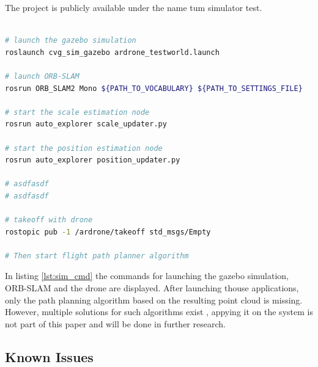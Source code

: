 	The project is publicly available under the name tum simulator test.
	
	\begin{lstlisting}[language=bash, caption= Launching the simulated environment, label=lst:sim_cmd]
	
# launch the gazebo simulation
roslaunch cvg_sim_gazebo ardrone_testworld.launch
	
# launch ORB-SLAM
rosrun ORB_SLAM2 Mono ${PATH_TO_VOCABULARY} ${PATH_TO_SETTINGS_FILE}

# start the scale estimation node
rosrun auto_explorer scale_updater.py

# start the position estimation node
rosrun auto_explorer position_updater.py

# asdfasdf
# asdfasdf
	
# takeoff with drone 
rostopic pub -1 /ardrone/takeoff std_msgs/Empty

# Then start flight path planner algorithm

	\end{lstlisting}
	
	In listing \ref{lst:sim_cmd} the commands for launching the gazebo simulation, ORB-SLAM and the drone are displayed. After launching thouse 
	applications, only the path planning algorithm based on the resulting point cloud is missing. However, multiple solutions for such algorithms 
	exist \cite{path}, appying it on the system is not part of this paper and will be done in further research. 

	\subsection{Known Issues} \label{frameissues}
	
